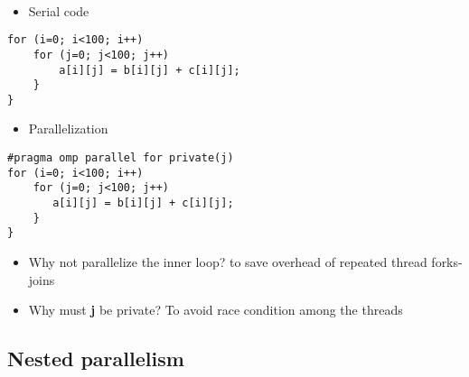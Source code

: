 \documentclass[%
oneside,                 %
final,                   %
10pt]{article}
\begin{document}
\paragraph{}

\begin{itemize}
 \item Serial code
\end{itemize}

\noindent






\begin{verbatim}
for (i=0; i<100; i++)
    for (j=0; j<100; j++)
        a[i][j] = b[i][j] + c[i][j];
    }
}

\end{verbatim}


\begin{itemize}
\item Parallelization
\end{itemize}

\noindent







\begin{verbatim}
#pragma omp parallel for private(j)
for (i=0; i<100; i++)
    for (j=0; j<100; j++)
       a[i][j] = b[i][j] + c[i][j];
    }
}

\end{verbatim}


\begin{itemize}
\item Why not parallelize the inner loop? to save overhead of repeated thread forks-joins

\item Why must \textbf{j} be private? To avoid race condition among the threads
\end{itemize}

\noindent



\subsection*{Nested parallelism}
\end{document}
